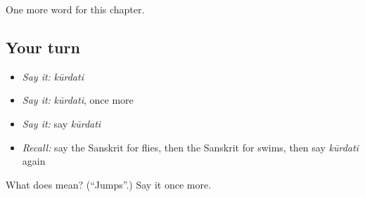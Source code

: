 \begin{grammarlens}[title={What you've built}]
One more word for this chapter.
\end{grammarlens}

\subsection*{Your turn}
\begin{itemize}
\raggedright
  \item \emph{Say it:} \emph{kūrdati}
  \item \emph{Say it:} \emph{kūrdati}, once more
  \item \emph{Say it:} say \emph{kūrdati}
  \item \emph{Recall:} say the Sanskrit for flies, then the Sanskrit for swims, then say \emph{kūrdati} again
\end{itemize}

\begin{tcolorbox}[breakable,colback=teal!4,colframe=teal!35!black,title={Before you move on}]
What does  mean? (\textquotedblleft{}Jumps\textquotedblright{}.) Say it once more.
\end{tcolorbox}
